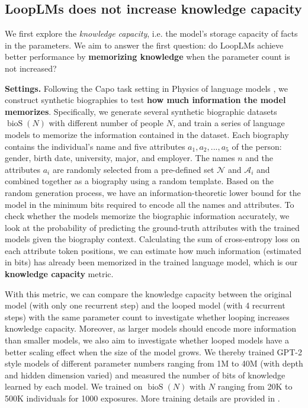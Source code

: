 \documentclass[]{bytedance_seed}
\newcommand{\1}{\mathbf{1}}
\newcommand{\ut}{LoopLM}
\begin{document}
\subsection{\ut{}s does not increase knowledge capacity}
\label{subsec:capacity}

We first explore the \textit{knowledge capacity}, i.e. the model's storage capacity of facts in the parameters. We aim to answer the first question: do \ut{}s achieve better performance by \textbf{memorizing knowledge} when the parameter count is not increased?

\textbf{Settings.} Following the Capo task setting in Physics of language models \cite{AL2024-knowledge3,Allenzhu2025-canon}, we construct synthetic biographies to test \textbf{how much information the model memorizes}. 
Specifically, we generate several synthetic biographic datasets $\operatorname{bioS}(N)$ with different number of people $N$, and train a series of language models to memorize the information contained in the dataset. Each biography contains the individual's name and five attributes $a_1,a_2,...,a_5$ of the person: gender, birth date, university, major, and employer. The names $n$ and the attributes $a_i$ are randomly selected from a pre-defined set $\mathcal{N}$ and $\mathcal{A}_i$ and combined together as a biography using a random template. Based on the random generation process, we have an information-theoretic lower bound for the model in the minimum bits required to encode all the names and attributes. To check whether the models memorize the biographic information accurately, we look at the probability of predicting the ground-truth attributes with the trained models given the biography context.  
Calculating the sum of cross-entropy loss on each attribute token positions, we can estimate how much information (estimated in bits) has already been memorized in the trained language model, which is our \textbf{knowledge capacity} metric. 

With this metric, we can compare the knowledge capacity between the original model (with only one recurrent step) and the looped model (with 4 recurrent steps) with the same parameter count to investigate whether looping increases knowledge capacity. Moreover, as larger models should encode more information than smaller models, we also aim to investigate whether looped models have a better scaling effect when the size of the model grows. 
We thereby trained GPT-2 style models of different parameter numbers ranging from 1M to 40M (with depth and hidden dimension varied) and measured the number of bits of knowledge learned by each model. We trained on $\operatorname{bioS}(N)$ with $N$ ranging from 20K to 500K individuals for 1000 exposures. More training details are provided in .
\end{document}
